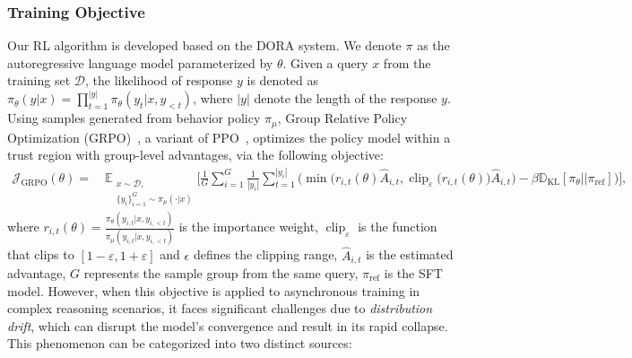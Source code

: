 \subsubsection{Training Objective}
Our RL algorithm is developed based on the DORA system. We denote $\pi$ as the autoregressive language model parameterized by $\theta$. Given a query $x$ from the training set $\mathcal{D}$, the likelihood of response $y$ is denoted as $\pi_\theta(y|x)=\prod_{t=1}^{|y|}\pi_\theta(y_t|x,y_{<t})$, where $|y|$ denote the length of the response $y$. Using samples generated from behavior policy $\pi_{\mu}$, Group Relative Policy Optimization (GRPO)~\citep{grpo}, a variant of PPO~\citep{schulman2017proximalpolicyoptimizationalgorithms}, optimizes the policy model within a trust region with group-level advantages, via the following objective:
\begin{equation}
\label{eq:grpo}
\begin{aligned}
\mathcal{J}_\text{GRPO}(\theta) =\ 
&\mathbb{E}_{\substack{x\sim\mathcal{D},\\\{y_i\}_{i=1}^G\sim\pi_{\mu}(\cdot|x)}}\Bigg[ 
    \frac{1}{G} 
    \sum_{i=1}^G \frac{1}{|y_i|}\sum_{t=1}^{|y_i|} \Bigg(
        \min \Big(
            r_{i, t}(\theta) \hat{A}_{i, t},\operatorname{clip}_\varepsilon\big(
                r_{i, t}(\theta)
            \big) \hat{A}_{i, t}
    \Big)-\beta\mathbb{D}_{\text{KL}}[\pi_\theta||\pi_{\text{ref}}]\Bigg) 
\Bigg],
\end{aligned}
\end{equation}
where $r_{i,t}(\theta)=\frac{\pi_{\theta}(y_{i,t}|x,y_{i,<t})}{\pi_{\mu}(y_{i,t}|x,y_{i,<t})}$ is the importance weight, $\operatorname{clip}_\varepsilon$ is the function that clips to $[1-\varepsilon,1+\varepsilon]$ and $\epsilon$ defines the clipping range, 
$\hat{A}_{i,t}$ is the estimated advantage, $G$ represents the sample group from the same query, $\pi_{\text{ref}}$ is the SFT model. However, when this objective is applied to asynchronous training in complex reasoning scenarios, it faces significant challenges due to \textit{distribution drift}, which can disrupt the model's convergence and result in its rapid collapse. This phenomenon can be categorized into two distinct sources:
